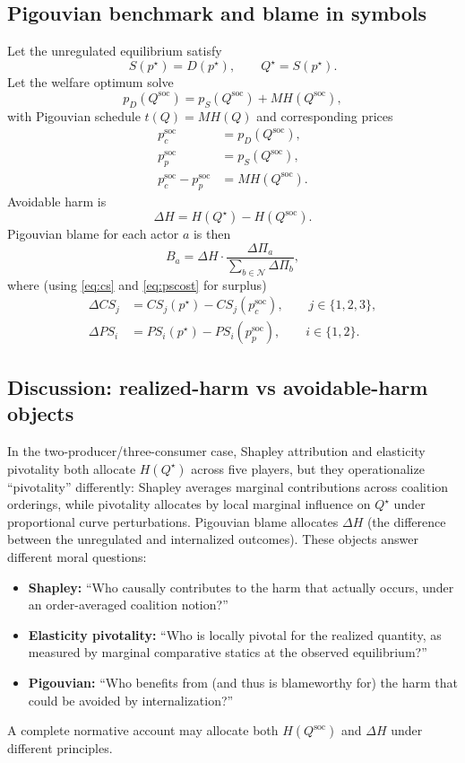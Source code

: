 \documentclass[journal, a4paper]{IEEEtran}
\begin{document}
\subsection{Pigouvian benchmark and blame in symbols}
Let the unregulated equilibrium satisfy
\begin{equation}
S(p^\star)=D(p^\star),\qquad Q^\star=S(p^\star).
\end{equation}
Let the welfare optimum solve
\begin{equation}
p_D(Q^{\text{soc}})=p_S(Q^{\text{soc}})+MH(Q^{\text{soc}}),
\end{equation}
with Pigouvian schedule $t(Q)=MH(Q)$ and corresponding prices
\begin{align}
p_c^{\text{soc}}&=p_D(Q^{\text{soc}}),\\ p_p^{\text{soc}}&=p_S(Q^{\text{soc}}),\\
p_c^{\text{soc}}-p_p^{\text{soc}}&=MH(Q^{\text{soc}}).
\end{align}
Avoidable harm is
\begin{equation}
\Delta H = H(Q^\star)-H(Q^{\text{soc}}).
\end{equation}
Pigouvian blame for each actor $a$ is then
\begin{equation}
B_a=\Delta H\cdot \frac{\Delta \Pi_a}{\sum_{b\in \mathcal{N}} \Delta \Pi_b},
\end{equation}
where (using \eqref{eq:cs} and \eqref{eq:pscost} for surplus)
\begin{align}
\Delta CS_j &= CS_j(p^\star)-CS_j(p_c^{\text{soc}}),\qquad j\in\{1,2,3\},\\
\Delta PS_i &= PS_i(p^\star)-PS_i(p_p^{\text{soc}}),\qquad i\in\{1,2\}.
\end{align}

\subsection{Discussion: realized-harm vs avoidable-harm objects}
In the two-producer/three-consumer case, Shapley attribution and elasticity pivotality both allocate $H(Q^\star)$ across five players, but they operationalize ``pivotality'' differently: Shapley averages marginal contributions across coalition orderings, while pivotality allocates by local marginal influence on $Q^\star$ under proportional curve perturbations. Pigouvian blame allocates $\Delta H$ (the difference between the unregulated and internalized outcomes). These objects answer different moral questions:
\begin{itemize}
\item \textbf{Shapley:} ``Who causally contributes to the harm that actually occurs, under an order-averaged coalition notion?''
\item \textbf{Elasticity pivotality:} ``Who is locally pivotal for the realized quantity, as measured by marginal comparative statics at the observed equilibrium?''
\item \textbf{Pigouvian:} ``Who benefits from (and thus is blameworthy for) the harm that could be avoided by internalization?''
\end{itemize}
A complete normative account may allocate both $H(Q^{\text{soc}})$ and $\Delta H$ under different principles.
\end{document}

